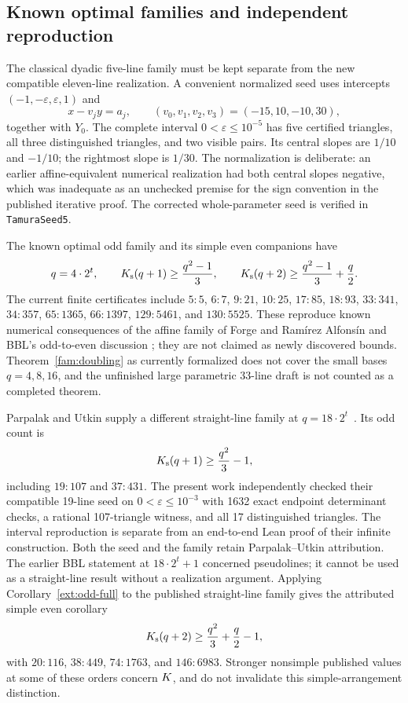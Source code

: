 \subsection{Known optimal families and independent reproduction}

The classical dyadic five-line family must be kept separate from the
new compatible eleven-line realization.  A convenient normalized seed
uses intercepts $(-1,-\varepsilon,\varepsilon,1)$ and
\[
 x-v_jy=a_j,\qquad (v_0,v_1,v_2,v_3)=(-15,10,-10,30),
\]
together with $Y_0$.  The complete interval
$0<\varepsilon\leq10^{-5}$ has five certified triangles, all three
distinguished triangles, and two visible pairs.  Its central slopes
are $1/10$ and $-1/10$; the rightmost slope is $1/30$.
The normalization is deliberate: an earlier affine-equivalent numerical
realization had both central slopes negative, which was inadequate as
an unchecked premise for the sign convention in the published iterative
proof.  The corrected whole-parameter seed is verified in
\texttt{TamuraSeed5}.

The known optimal odd family and its simple even companions have
\begin{equation}
 q=4\cdot2^t,\qquad
 K_{\mathrm{s}}(q+1)\geq\frac{q^2-1}{3},\qquad
 K_{\mathrm{s}}(q+2)\geq\frac{q^2-1}{3}+\frac q2.
 \label{fam:tamura}
\end{equation}
The current finite certificates include
$5:5$, $6:7$, $9:21$, $10:25$, $17:85$, $18:93$, $33:341$,
$34:357$, $65:1365$, $66:1397$, $129:5461$, and $130:5525$.
These reproduce known numerical consequences of the affine family of
Forge and Ram\'irez Alfons\'in and BBL's odd-to-even discussion
\cite{forge1998,bbl2008}; they are not claimed as newly discovered
bounds.  Theorem~\ref{fam:doubling} as currently formalized does not
cover the small bases $q=4,8,16$, and the unfinished large parametric
33-line draft is not counted as a completed theorem.

Parpalak and Utkin supply a different straight-line family at
$q=18\cdot2^t$~\cite{parpalakutkin2026}.  Its odd count is
\begin{equation}
 K_{\mathrm{s}}(q+1)\geq\frac{q^2}{3}-1,
 \label{fam:pu}
\end{equation}
including $19:107$ and $37:431$.  The present work independently checked
their compatible 19-line seed on $0<\varepsilon\leq10^{-3}$ with 1632
exact endpoint determinant checks, a rational 107-triangle witness,
and all 17 distinguished triangles.  The interval reproduction is
separate from an end-to-end Lean proof of their infinite construction.
Both the seed and the family retain Parpalak--Utkin attribution.
The earlier BBL statement at $18\cdot2^t+1$ concerned pseudolines;
it cannot be used as a straight-line result without a realization
argument.  Applying Corollary~\ref{ext:odd-full} to the published
straight-line family gives the attributed simple even corollary
\[
 K_{\mathrm{s}}(q+2)\geq\frac{q^2}{3}+\frac q2-1,
\]
with $20:116$, $38:449$, $74:1763$, and $146:6983$.  Stronger nonsimple
published values at some of these orders concern $K$, and do not
invalidate this simple-arrangement distinction.

